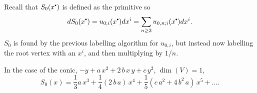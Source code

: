     
    
    
    Recall that \(S_0(x^{\sbt})\) is defined as the primitive so \[ d S_0(x^{\sbt}) = u_{0;i}(x^{\sbt}) dx^i = \sum_{n \geq 3} u_{0,n;i}(x^{\sbt}) dx^i.\] 
    \(S_0\) is found by the previous labelling algorithm for \(u_{0,i}\), but instead now labelling the root vertex with an \(x^i\), and then multiplying by \(1/n\).
    \begin{ex}
    In the case of the conic, \(-y+a\,x^2 + 2 \,b \,x\, y + c\, y^2\), \( \dim(V)=1\),
    \[ S_0(x)= \frac{1}{3} a\, x^3 + \frac{1}{4}(2\, b\, a) \,x^4 + \frac{1}{5}( c \,a^2 + 4 \,b^2\, a)\,x^5 + \dots. \]
    \end{ex} 

    
   

        
    
